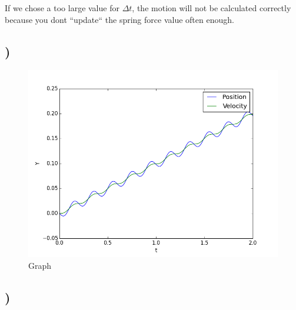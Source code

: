 \documentclass[a4paper,10pt,norsk]{article}
\begin{document}
If we chose a too large value for $\Delta t$, the motion will not be calculated correctly because you dont ``update`` the spring force value often enough.

\subsection{)}


\begin{figure}[h!]
        \centering 
        \includegraphics[scale=0.5]{oppg_r.png} 
        \caption{Graph}
\end{figure}

\pagebreak

\subsection{)}


\end{document}
